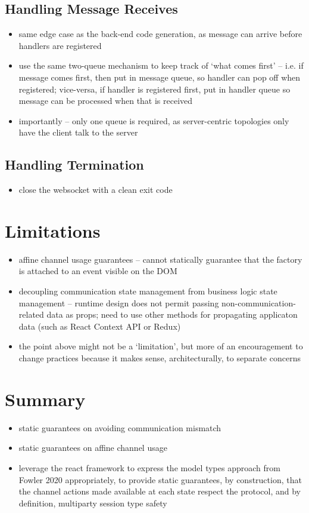 \subsection{Handling Message Receives}
\begin{itemize}
\item same edge case as the back-end code generation, as message can arrive before handlers are registered
\item use the same two-queue mechanism to keep track of `what comes first' -- i.e. if message comes first, then put in message queue, so handler can pop off when registered; vice-versa, if handler is registered first, put in handler queue so message can be processed when that is received
\item importantly -- only one queue is required, as server-centric topologies only have the client talk to the server
\end{itemize}

\subsection{Handling Termination}
\begin{itemize}
\item close the websocket with a clean exit code
\end{itemize}

\section{Limitations}
\begin{itemize}
\item affine channel usage guarantees -- cannot statically guarantee that the factory is attached to an event visible on the DOM
\item decoupling communication state management from business logic state management -- runtime design does not permit passing non-communication-related data as props; need to use other methods for propagating applicaton data (such as React Context API or Redux)
\item the point above might not be a `limitation', but more of an encouragement to change practices because it makes sense, architecturally, to separate concerns
\end{itemize}

\section{Summary}
\begin{itemize}
\item static guarantees on avoiding communication mismatch
\item static guarantees on affine channel usage
\item leverage the react framework to express the model types approach from Fowler 2020 appropriately, to provide static guarantees, by construction, that the channel actions made available at each state respect the protocol, and by definition, multiparty session type safety
\end{itemize}